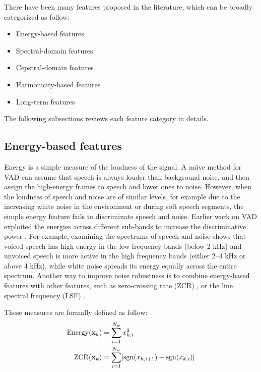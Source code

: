 There have been many features proposed in the literature, which can be broadly categorized as follow:
\begin{itemize}\addtolength{\itemsep}{-0.5\baselineskip}
	\item Energy-based features  %
	\item Spectral-domain features  %
	\item Cepstral-domain features  %
	\item Harmonicity-based features  %
	\item Long-term features  %
\end{itemize}
The following subsections reviews each feature category in details.

\subsection{Energy-based features}
Energy is a simple measure of the loudness of the signal.
A na\"\i ve method for VAD can assume that speech is always louder than background noise, and then assign the high-energy frames to speech and lower ones to noise.
However, when the loudness of speech and noise are of similar levels, for example due to the increasing white noise in the environment or during soft speech segments, the simple energy feature fails to discriminate speech and noise.
Earlier work on VAD exploited the energies across different sub-bands to increase the discriminative power \cite{woo2000robust,benyassine1997robust}.
For example, examining the spectrums of speech and noise shows that voiced speech has high energy in the low frequency bands (below 2 kHz) and unvoiced speech is more active in the high frequency bands (either 2--4 kHz or above 4 kHz), while white noise spreads its energy equally across the entire spectrum.
Another way to improve noise robustness is to combine energy-based features with other features, such as zero-crossing rate (ZCR) \cite{rabiner1975algorithm,cho2011enhanced}, or the line spectral frequency (LSF) \cite{benyassine1997robust}.

These measures are formally defined as follow:
\begin{align}
    \operatorname*{Energy}(\mathbf{x}_k) & = \sum_{i=1}^{N_w} x_{k,i}^2   \\
    \operatorname*{ZCR}(\mathbf{x}_k) & = \sum_{i=1}^{N_w} \lvert\operatorname{sgn}(x_{k,i+1}) - \operatorname{sgn}(x_{k,i})\rvert
\end{align}

